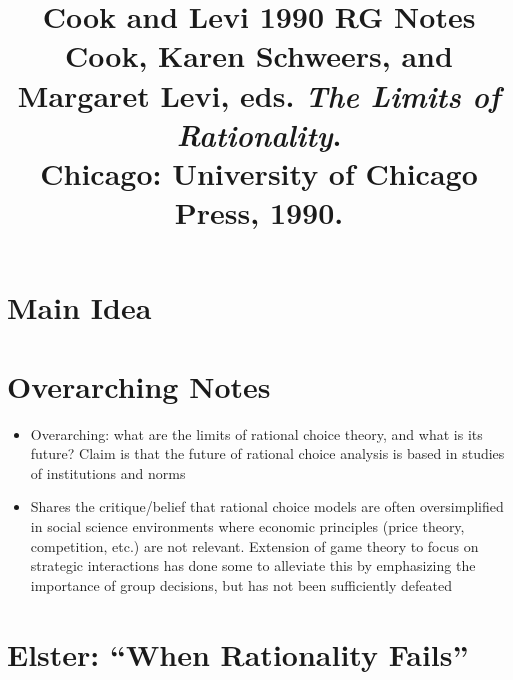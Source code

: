\documentclass[12pt]{article}
\title{\textbf{Cook and Levi 1990 RG Notes}\\
\large Cook, Karen Schweers, and Margaret Levi, eds. \textit{The Limits of Rationality}.\\
Chicago: University of Chicago Press, 1990.}
\author{}
\date{}
\begin{document}
\maketitle

\section{Main Idea}



\section*{Overarching Notes}

\begin{itemize}[leftmargin=*, itemsep=4pt]
    \item Overarching: what are the limits of rational choice theory, and what is its future? Claim is that the future of rational choice analysis is based in studies of institutions and norms
    \item Shares the critique/belief that rational choice models are often oversimplified in social science environments where economic principles (price theory, competition, etc.) are not relevant. Extension of game theory to focus on strategic interactions has done some to alleviate this by emphasizing the importance of group decisions, but has not been sufficiently defeated
\end{itemize}


\section{Elster: ``When Rationality Fails''}
\end{document}
